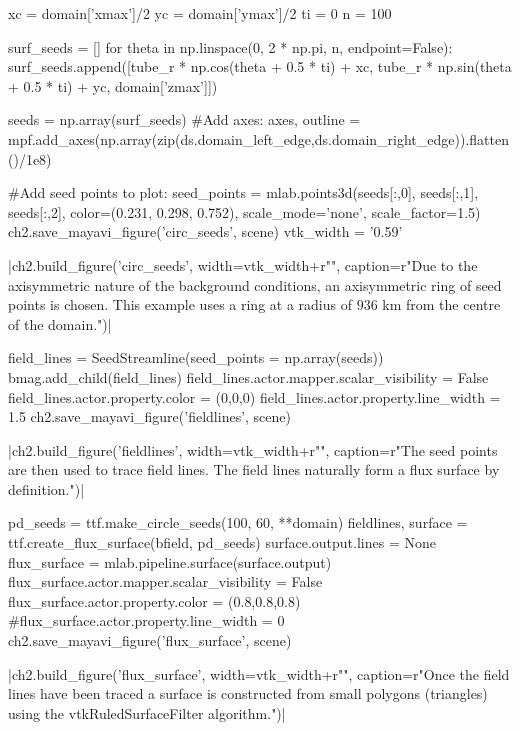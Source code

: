 \begin{pycode}[chapter2]
xc = domain['xmax']/2
yc = domain['ymax']/2
ti = 0
n = 100

surf_seeds = []
for theta in np.linspace(0, 2 * np.pi, n, endpoint=False):
    surf_seeds.append([tube_r * np.cos(theta + 0.5 * ti) + xc,
                  tube_r * np.sin(theta + 0.5 * ti) + yc, domain['zmax']])
                  
seeds = np.array(surf_seeds)
#Add axes:
axes, outline = mpf.add_axes(np.array(zip(ds.domain_left_edge,ds.domain_right_edge)).flatten()/1e8)

#Add seed points to plot:
seed_points = mlab.points3d(seeds[:,0], seeds[:,1], seeds[:,2],
                            color=(0.231, 0.298, 0.752), scale_mode='none',
                            scale_factor=1.5)
ch2.save_mayavi_figure('circ_seeds', scene)
vtk_width = '0.59'
\end{pycode}
\py[chapter2]|ch2.build_figure('circ_seeds', width=vtk_width+r"\columnwidth",
caption=r"Due to the axisymmetric nature of the background conditions, an axisymmetric ring of seed points is chosen. This example uses a ring at a radius of $936$ km from the centre of the domain.")|

\begin{pycode}[chapter2]
field_lines = SeedStreamline(seed_points = np.array(seeds))
bmag.add_child(field_lines)
field_lines.actor.mapper.scalar_visibility = False
field_lines.actor.property.color = (0,0,0)
field_lines.actor.property.line_width = 1.5
ch2.save_mayavi_figure('fieldlines', scene)
\end{pycode}
\py[chapter2]|ch2.build_figure('fieldlines', width=vtk_width+r"\columnwidth",
caption=r"The seed points are then used to trace field lines. The field lines naturally form a flux surface by definition.")|

\begin{pycode}[chapter2]
pd_seeds = ttf.make_circle_seeds(100, 60, **domain)
fieldlines, surface = ttf.create_flux_surface(bfield, pd_seeds)
surface.output.lines = None
flux_surface = mlab.pipeline.surface(surface.output)
flux_surface.actor.mapper.scalar_visibility = False
flux_surface.actor.property.color = (0.8,0.8,0.8)
#flux_surface.actor.property.line_width = 0
ch2.save_mayavi_figure('flux_surface', scene)
\end{pycode}
\py[chapter2]|ch2.build_figure('flux_surface', width=vtk_width+r"\columnwidth",
caption=r"Once the field lines have been traced a surface is constructed from small polygons (triangles) using the vtkRuledSurfaceFilter algorithm.")|

